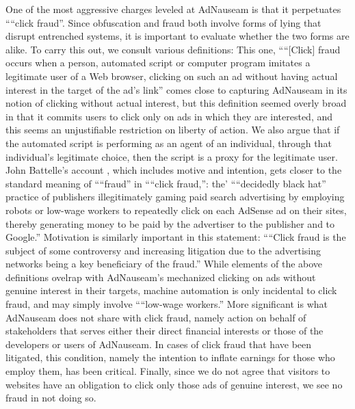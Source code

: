 \documentclass[conference]{IEEEtran}
\begin{document}
One of the most aggressive charges leveled at AdNauseam is that it perpetuates ““click fraud”. Since obfuscation and fraud both involve forms of lying that disrupt entrenched systems, it is important to evaluate whether the two forms are alike.  To carry this out, we consult various definitions: This one,   ““[Click] fraud occurs when a person, automated script or computer program imitates a legitimate user of a Web browser, clicking on such an ad without having actual interest in the target of the ad's link”\cite{Liu} comes close to capturing AdNauseam in its notion of clicking without actual interest, but this definition seemed overly broad in that it commits users to click only on ads in which they are interested, and this seems an unjustifiable restriction on liberty of action. We also argue that if the automated script is performing as an agent of an individual, through that individual's legitimate choice, then the script is a proxy for the legitimate user. John Battelle's account \cite{Battelle}, which includes motive and intention, gets closer to the standard meaning of ““fraud” in ““click fraud,”: the' ““decidedly black hat” practice of publishers illegitimately gaming paid search advertising by employing robots or low-wage workers to repeatedly click on each AdSense ad on their sites, thereby generating money to be paid by the advertiser to the publisher and to Google.” Motivation is similarly important in this statement: ““Click fraud is the subject of some controversy and increasing litigation due to the advertising networks being a key beneficiary of the fraud.” \cite{ClickFraud}
While elements of the above definitions ovelrap with AdNauseam's mechanized clicking on ads without genuine interest in their targets, machine automation is only incidental to click fraud, and may simply involve ““low-wage workers.” More significant is what AdNauseam does not share with click fraud, namely action on behalf of stakeholders that serves either their direct financial interests or those of the developers or users of AdNauseam. In cases of click fraud that have been litigated, this condition, namely the intention to inflate earnings for those who employ them, has been critical. Finally, since we do not agree that visitors to websites have an obligation to click only those ads of genuine interest, we see no fraud in not doing so.
\end{document}
